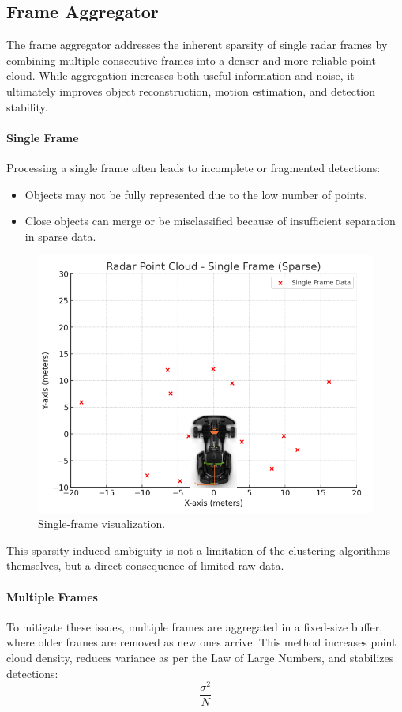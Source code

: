 \subsection{Frame Aggregator}  
The frame aggregator addresses the inherent sparsity of single radar frames by combining multiple consecutive frames into a denser and more reliable point cloud.  
While aggregation increases both useful information and noise, it ultimately improves object reconstruction, motion estimation, and detection stability.

\paragraph{Single Frame}
Processing a single frame often leads to incomplete or fragmented detections:
\begin{itemize}
    \item Objects may not be fully represented due to the low number of points.
    \item Close objects can merge or be misclassified because of insufficient separation in sparse data.
\end{itemize}

\begin{figure}[!htbp]
    \centering
    \includegraphics[width=0.5\linewidth]{images/singleframe.png}
    \caption{Single-frame visualization.}
    \label{fig:single_frame}
\end{figure}

This sparsity-induced ambiguity is not a limitation of the clustering algorithms themselves, but a direct consequence of limited raw data.

\paragraph{Multiple Frames}
To mitigate these issues, multiple frames are aggregated in a fixed-size buffer, where older frames are removed as new ones arrive.  
This method increases point cloud density, reduces variance as per the Law of Large Numbers, and stabilizes detections:
\begin{equation}
    \frac{\sigma^2}{N}
    \label{eq:variance_per_sample_size}
\end{equation}

